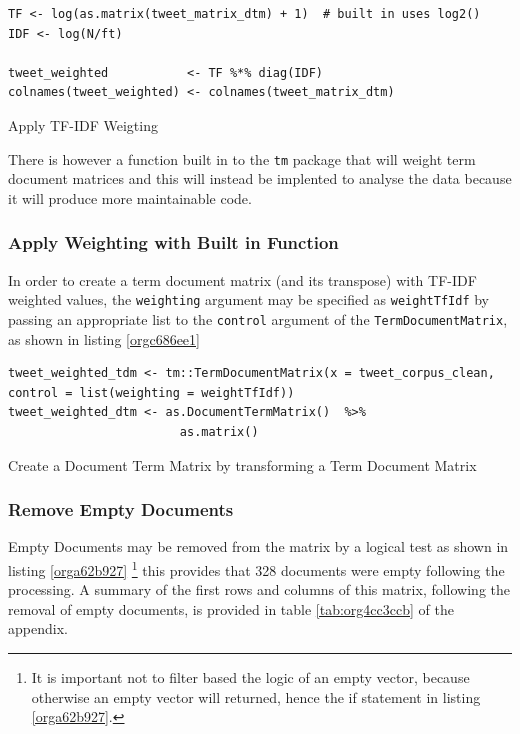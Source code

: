 \documentclass[11pt]{article}
\begin{document}
\begin{enumerate}
\begin{listing}[htbp]
\begin{verbatim}
TF <- log(as.matrix(tweet_matrix_dtm) + 1)  # built in uses log2()
IDF <- log(N/ft)

tweet_weighted           <- TF %*% diag(IDF)
colnames(tweet_weighted) <- colnames(tweet_matrix_dtm)
\end{verbatim}
\caption{\label{org525307a}Apply TF-IDF Weigting}
\end{listing}

There is however a function built in to the \texttt{tm} package that will weight term document matrices and this will instead be implented to analyse the data because it will produce more maintainable code.
\end{enumerate}

\subsubsection{Apply Weighting with Built in Function}
\label{sec:org8a9f761}
In order to create a term document matrix (and its transpose) with TF-IDF weighted values, the \texttt{weighting} argument may be specified as \texttt{weightTfIdf} by passing an appropriate list to the \texttt{control} argument of the \texttt{TermDocumentMatrix}, as shown in listing \ref{orgc686ee1}

\begin{listing}[htbp]
\begin{verbatim}
tweet_weighted_tdm <- tm::TermDocumentMatrix(x = tweet_corpus_clean, control = list(weighting = weightTfIdf))
tweet_weighted_dtm <- as.DocumentTermMatrix()  %>%
                        as.matrix()
\end{verbatim}
\caption{\label{orgc686ee1}Create a Document Term Matrix by transforming a Term Document Matrix}
\end{listing}

\subsubsection{Remove Empty Documents}
\label{sec:org883b628}
Empty Documents may be removed from the matrix by a logical test as shown in listing  \ref{orga62b927} \footnote{It is important not to filter based the logic of an empty vector, because
otherwise an empty vector will returned, hence the if statement in listing \ref{orga62b927}.} this provides that 328 documents were empty following the processing. A summary of the first rows and columns of this matrix, following the removal of empty documents, is provided in table \ref{tab:org4cc3ccb} of the appendix.
\end{document}
